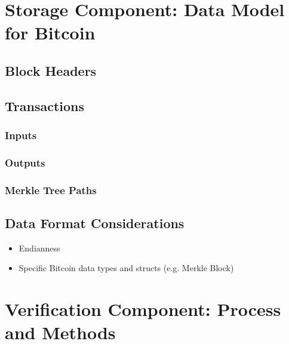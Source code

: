 \documentclass[letterpaper,10pt,english]{sphinxmanual}
\begin{document}
\chapter{Storage Component: Data Model for Bitcoin}
\label{\detokenize{data-model:storage-component-data-model-for-bitcoin}}\label{\detokenize{data-model::doc}}

\section{Block Headers}
\label{\detokenize{data-model:block-headers}}

\section{Transactions}
\label{\detokenize{data-model:transactions}}

\subsection{Inputs}
\label{\detokenize{data-model:inputs}}

\subsection{Outputs}
\label{\detokenize{data-model:outputs}}

\subsection{Merkle Tree Paths}
\label{\detokenize{data-model:merkle-tree-paths}}

\section{Data Format Considerations}
\label{\detokenize{data-model:data-format-considerations}}\begin{itemize}
\item {} 
Endianness

\item {} 
Specific Bitcoin data types and structs (e.g. Merkle Block)

\end{itemize}


\chapter{Verification Component: Process and Methods}
\label{\detokenize{verification-methods:verification-component-process-and-methods}}\label{\detokenize{verification-methods::doc}}
\end{document}
